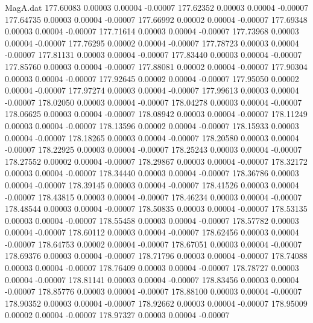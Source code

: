 \begin{filecontents}{MagA.dat}
 177.60083    0.00003    0.00004   -0.00007
 177.62352    0.00003    0.00004   -0.00007
 177.64735    0.00003    0.00004   -0.00007
 177.66992    0.00002    0.00004   -0.00007
 177.69348    0.00003    0.00004   -0.00007
 177.71614    0.00003    0.00004   -0.00007
 177.73968    0.00003    0.00004   -0.00007
 177.76295    0.00002    0.00004   -0.00007
 177.78723    0.00003    0.00004   -0.00007
 177.81131    0.00003    0.00004   -0.00007
 177.83440    0.00003    0.00004   -0.00007
 177.85760    0.00003    0.00004   -0.00007
 177.88081    0.00002    0.00004   -0.00007
 177.90304    0.00003    0.00004   -0.00007
 177.92645    0.00002    0.00004   -0.00007
 177.95050    0.00002    0.00004   -0.00007
 177.97274    0.00003    0.00004   -0.00007
 177.99613    0.00003    0.00004   -0.00007
 178.02050    0.00003    0.00004   -0.00007
 178.04278    0.00003    0.00004   -0.00007
 178.06625    0.00003    0.00004   -0.00007
 178.08942    0.00003    0.00004   -0.00007
 178.11249    0.00003    0.00004   -0.00007
 178.13596    0.00002    0.00004   -0.00007
 178.15933    0.00003    0.00004   -0.00007
 178.18265    0.00003    0.00004   -0.00007
 178.20580    0.00003    0.00004   -0.00007
 178.22925    0.00003    0.00004   -0.00007
 178.25243    0.00003    0.00004   -0.00007
 178.27552    0.00002    0.00004   -0.00007
 178.29867    0.00003    0.00004   -0.00007
 178.32172    0.00003    0.00004   -0.00007
 178.34440    0.00003    0.00004   -0.00007
 178.36786    0.00003    0.00004   -0.00007
 178.39145    0.00003    0.00004   -0.00007
 178.41526    0.00003    0.00004   -0.00007
 178.43815    0.00003    0.00004   -0.00007
 178.46234    0.00003    0.00004   -0.00007
 178.48544    0.00003    0.00004   -0.00007
 178.50835    0.00003    0.00004   -0.00007
 178.53135    0.00003    0.00004   -0.00007
 178.55458    0.00003    0.00004   -0.00007
 178.57782    0.00003    0.00004   -0.00007
 178.60112    0.00003    0.00004   -0.00007
 178.62456    0.00003    0.00004   -0.00007
 178.64753    0.00002    0.00004   -0.00007
 178.67051    0.00003    0.00004   -0.00007
 178.69376    0.00003    0.00004   -0.00007
 178.71796    0.00003    0.00004   -0.00007
 178.74088    0.00003    0.00004   -0.00007
 178.76409    0.00003    0.00004   -0.00007
 178.78727    0.00003    0.00004   -0.00007
 178.81141    0.00003    0.00004   -0.00007
 178.83456    0.00003    0.00004   -0.00007
 178.85776    0.00003    0.00004   -0.00007
 178.88100    0.00003    0.00004   -0.00007
 178.90352    0.00003    0.00004   -0.00007
 178.92662    0.00003    0.00004   -0.00007
 178.95009    0.00002    0.00004   -0.00007
 178.97327    0.00003    0.00004   -0.00007

\end{filecontents}
